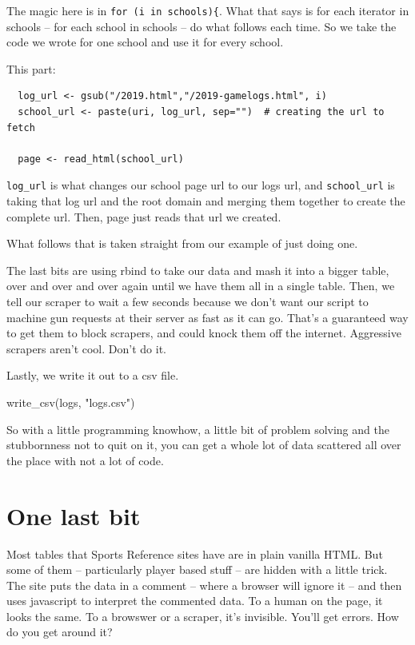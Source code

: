 \documentclass[
]{book}
\newenvironment{Shaded}{\begin{snugshade}}{\end{snugshade}}
\newcommand{\FunctionTok}[1]{\textcolor[rgb]{0.00,0.00,0.00}{#1}}
\newcommand{\NormalTok}[1]{#1}
\newcommand{\StringTok}[1]{\textcolor[rgb]{0.31,0.60,0.02}{#1}}
\begin{document}
The magic here is in \texttt{for\ (i\ in\ schools)\{}. What that says is for each iterator in schools -- for each school in schools -- do what follows each time. So we take the code we wrote for one school and use it for every school.

This part:

\begin{verbatim}
  log_url <- gsub("/2019.html","/2019-gamelogs.html", i)
  school_url <- paste(uri, log_url, sep="")  # creating the url to fetch
  
  page <- read_html(school_url)
\end{verbatim}

\texttt{log\_url} is what changes our school page url to our logs url, and \texttt{school\_url} is taking that log url and the root domain and merging them together to create the complete url. Then, page just reads that url we created.

What follows that is taken straight from our example of just doing one.

The last bits are using rbind to take our data and mash it into a bigger table, over and over and over again until we have them all in a single table. Then, we tell our scraper to wait a few seconds because we don't want our script to machine gun requests at their server as fast as it can go. That's a guaranteed way to get them to block scrapers, and could knock them off the internet. Aggressive scrapers aren't cool. Don't do it.

Lastly, we write it out to a csv file.

\begin{Shaded}
\begin{Highlighting}[]
\FunctionTok{write\_csv}\NormalTok{(logs, }\StringTok{"logs.csv"}\NormalTok{)}
\end{Highlighting}
\end{Shaded}

So with a little programming knowhow, a little bit of problem solving and the stubbornness not to quit on it, you can get a whole lot of data scattered all over the place with not a lot of code.

\hypertarget{one-last-bit}{%
\section{One last bit}\label{one-last-bit}}

Most tables that Sports Reference sites have are in plain vanilla HTML. But some of them -- particularly player based stuff -- are hidden with a little trick. The site puts the data in a comment -- where a browser will ignore it -- and then uses javascript to interpret the commented data. To a human on the page, it looks the same. To a browswer or a scraper, it's invisible. You'll get errors. How do you get around it?
\end{document}
